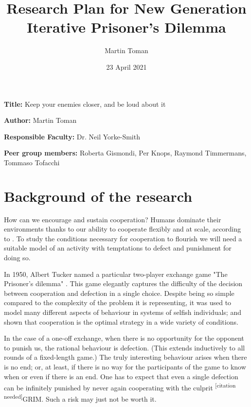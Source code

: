 \documentclass[english]{article}
\title{Research Plan for New Generation Iterative Prisoner's Dilemma}
\author{Martin Toman}
\date{23 April 2021}
\newcommand{\citationneeded}{\textsuperscript{\color{blue} [citation needed]}}
\newcommand{\namelistlabel}[1]{\mbox{#1}\hfil}
\newenvironment{namelist}[1]{%
\begin{list}{}{
  \let\makelabel\namelistlabel
  \settowidth{\labelwidth}{#1}
  \setlength{\leftmargin}{1.1\labelwidth}
}}{%
\end{list}}
\begin{document}
\listoftodos

\maketitle
\begin{namelist}{}
\item[{\bf Title:}]
  Keep your enemies closer, and be loud about it
\item[{\bf Author:}]
  Martin Toman
\item[{\bf Responsible Faculty:}]
  Dr. Neil Yorke-Smith
\item[{\bf Peer group members:}]
  Roberta Gismondi,
  Per Knops,
  Raymond Timmermans,
  Tommaso Tofacchi
\end{namelist}



\section*{Background of the research}

How can we encourage and sustain cooperation? Humans dominate their environments thanks to our ability to cooperate flexibly and at scale, according to \citet{harari-sapiens}.
To study the conditions necessary for cooperation to flourish we will need a suitable model of an activity with temptations to defect and punishment for doing so.

In 1950, Albert Tucker named a particular two-player exchange game "The Prisoner's dilemma" \citep{sep-prisoner-dilemma}.
This game elegantly captures the difficulty of the decision between cooperation and defection in a single choice.
Despite being so simple compared to the complexity of the problem it is representing, it was used to model many different aspects of behaviour in systems of selfish individuals; and shown that cooperation is the optimal strategy in a wide variety of conditions.

In the case of a one-off exchange, when there is no opportunity for the opponent to punish us, the rational behaviour is defection. (This extends inductively to all rounds of a fixed-length game.)
The truly interesting behaviour arises when there is no end; or, at least, if there is no way for the participants of the game to know when or even if there is an end.
One has to expect that even a single defection can be infinitely punished by never again cooperating with the culprit \citationneeded{GRIM}.
Such a risk may just not be worth it.
\end{document}
